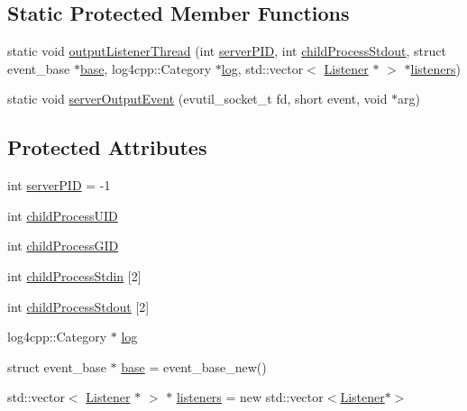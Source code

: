 \subsection*{Static Protected Member Functions}
\begin{DoxyCompactItemize}
\item 
static void \hyperlink{class_minecraft_server_service_1_1_server_a3040817c744456263f8ba36bdb72bf20}{output\+Listener\+Thread} (int \hyperlink{class_minecraft_server_service_1_1_server_abdb911338643b10beee5393851afb4c8}{server\+P\+ID}, int \hyperlink{class_minecraft_server_service_1_1_server_abb0ccd5070cc03476fc00e2e7674de6a}{child\+Process\+Stdout}, struct event\+\_\+base $\ast$\hyperlink{class_minecraft_server_service_1_1_server_a12dbc6c931c04754ef5600e8ad03cc4c}{base}, log4cpp\+::\+Category $\ast$\hyperlink{class_minecraft_server_service_1_1_server_aea87340c35422279f868ecf8edc4a9f6}{log}, std\+::vector$<$ \hyperlink{struct_minecraft_server_service_1_1_server_1_1_listener}{Listener} $\ast$ $>$ $\ast$\hyperlink{class_minecraft_server_service_1_1_server_a51c6dda2196eb9ee8ff671deacb66dae}{listeners})
\item 
static void \hyperlink{class_minecraft_server_service_1_1_server_a4ecf103c62bd8f1e54b2ff436fa1645a}{server\+Output\+Event} (evutil\+\_\+socket\+\_\+t fd, short event, void $\ast$arg)
\end{DoxyCompactItemize}
\subsection*{Protected Attributes}
\begin{DoxyCompactItemize}
\item 
int \hyperlink{class_minecraft_server_service_1_1_server_abdb911338643b10beee5393851afb4c8}{server\+P\+ID} = -\/1
\item 
int \hyperlink{class_minecraft_server_service_1_1_server_af2c725b65183545aee7228aae35b6967}{child\+Process\+U\+ID}
\item 
int \hyperlink{class_minecraft_server_service_1_1_server_a116eb894b58076ec10c694d4acb11d48}{child\+Process\+G\+ID}
\item 
int \hyperlink{class_minecraft_server_service_1_1_server_a6fa4025b32b4ff9aa2cce5c33c6a5eff}{child\+Process\+Stdin} \mbox{[}2\mbox{]}
\item 
int \hyperlink{class_minecraft_server_service_1_1_server_abb0ccd5070cc03476fc00e2e7674de6a}{child\+Process\+Stdout} \mbox{[}2\mbox{]}
\item 
log4cpp\+::\+Category $\ast$ \hyperlink{class_minecraft_server_service_1_1_server_aea87340c35422279f868ecf8edc4a9f6}{log}
\item 
struct event\+\_\+base $\ast$ \hyperlink{class_minecraft_server_service_1_1_server_a12dbc6c931c04754ef5600e8ad03cc4c}{base} = event\+\_\+base\+\_\+new()
\item 
std\+::vector$<$ \hyperlink{struct_minecraft_server_service_1_1_server_1_1_listener}{Listener} $\ast$ $>$ $\ast$ \hyperlink{class_minecraft_server_service_1_1_server_a51c6dda2196eb9ee8ff671deacb66dae}{listeners} = new std\+::vector$<$\hyperlink{struct_minecraft_server_service_1_1_server_1_1_listener}{Listener}$\ast$$>$
\end{DoxyCompactItemize}


